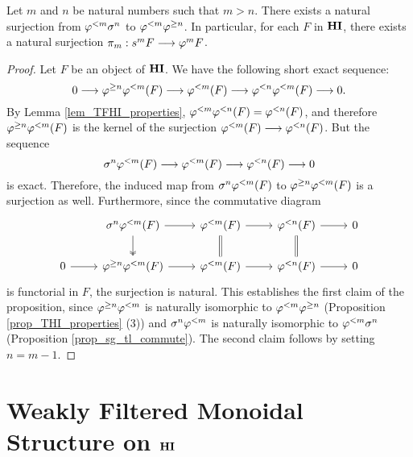 \begin{prop}\label{prop_struct_consts}
Let $m$ and $n$ be natural numbers such that $m > n$. There exists 
a natural surjection from $\varphi^{< m} \sigma^{n}$ to $\varphi^{< m} 
\varphi^{\geq n}$. In particular, for each $F$ in $\mathbf{HI}$, there exists a 
natural surjection $\pi_m: s^m F \longrightarrow \varphi^{m} F$.
\end{prop}
\begin{proof}
Let $F$ be an object of $\mathbf{HI}$. We have the following short exact
sequence:
\[
0 \longrightarrow \varphi^{\geq n} \varphi^{< m}(F) \longrightarrow \varphi^{< m}(F) \longrightarrow 
  \varphi^{< n} \varphi^{< m}(F) \longrightarrow 0.
\]
By Lemma \ref{lem_TFHI_properties}, $\varphi^{< m} \varphi^{< n}(F) 
= \varphi^{< n}(F)$, and therefore $\varphi^{\geq n} \varphi^{< m}(F)$ is the kernel 
of the surjection $\varphi^{< m}(F) \longrightarrow \varphi^{< n}(F)$. But the sequence
\[
\sigma^{n} \varphi^{< m}(F) \longrightarrow \varphi^{< m}(F) \longrightarrow \varphi^{< n}(F) \longrightarrow 0
\]
is exact. Therefore, the induced map from $\sigma^{n} \varphi^{< m}(F)$
to $\varphi^{\geq n} \varphi^{< m}(F)$ is a surjection as well. Furthermore,
since the commutative diagram
\[
\begin{tikzcd}
{} & \sgHI{n} \tlHI{m}(F) \arrow{r} \arrow[twoheadrightarrow]{d} &
\tlHI{m}(F) \arrow{r} \arrow[equal]{d} &
\tlHI{n}(F) \arrow{r} \arrow[equal]{d} &
0 \\
0 \arrow{r} &
\tgHI{n} \tlHI{m}(F) \arrow{r} &
\tlHI{m}(F) \arrow{r} &
\tlHI{n}(F) \arrow{r} &
0
\end{tikzcd}
\] 
is functorial in $F$, the surjection is natural. This establishes the
first claim of the proposition, since $\varphi^{\geq n} \varphi^{< m}$ is naturally
isomorphic to $\varphi^{< m} \varphi^{\geq n}$ (Proposition
\ref{prop_THI_properties} (3)) and $\sigma^{n} \varphi^{< m}$ is naturally
isomorphic to $\varphi^{< m} \sigma^{n}$ (Proposition
\ref{prop_sg_tl_commute}). The second claim follows by setting $n = m
- 1$.
\end{proof}

\section{Weakly Filtered Monoidal Structure on $\mathbf{HI}$}


